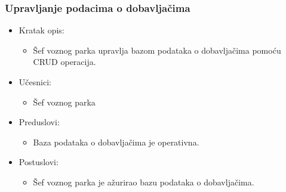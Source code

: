 \subsubsection{\bfseries Upravljanje podacima o dobavljačima}

\begin{itemize}
	\item Kratak opis:
		\begin{itemize}
			\item Šef voznog parka upravlja bazom podataka o dobavljačima pomoću CRUD operacija.
		\end{itemize}

	\item Učesnici:
		\begin{itemize}
		    \item Šef voznog parka
		\end{itemize}


	\item Preduslovi:
		\begin{itemize}
		    \item Baza podataka o dobavljačima je operativna.
		\end{itemize}


	\item Postuslovi:
		\begin{itemize}
			\item Šef voznog parka je ažurirao bazu podataka o dobavljačima.
	\end{itemize}


\end{itemize}
